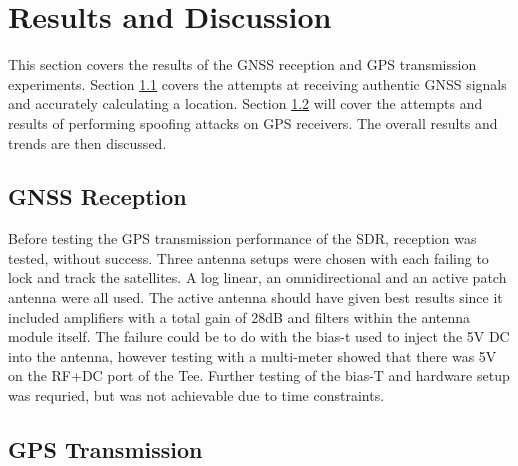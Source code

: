 
\chapter{Results and Discussion} %

\label{Chapter5} %

This section covers the results of the GNSS reception and GPS transmission experiments. Section \ref{sec:Res_GNSSReception} covers the attempts at receiving authentic GNSS
signals and accurately calculating a location. Section \ref{sec:Res_GPSTransmission} will cover the attempts and results of performing spoofing attacks on GPS receivers.
The overall results and trends are then discussed.

\section{GNSS Reception} \label{sec:Res_GNSSReception}
Before testing the GPS transmission performance of the SDR, reception was tested, without success. Three antenna setups were chosen with each failing to lock and track the
satellites. A log linear, an omnidirectional and an active patch antenna were all used. The active antenna should have given best results since it included amplifiers
with a total gain of 28dB and
filters within the antenna module itself. The failure could be to do with the bias-t used to inject the 5V DC into the antenna, however testing with a multi-meter showed
that there was 5V on the RF+DC port of the Tee. Further testing of the bias-T and hardware setup was requried, but was not achievable due to time constraints.


\section{GPS Transmission} \label{sec:Res_GPSTransmission}

